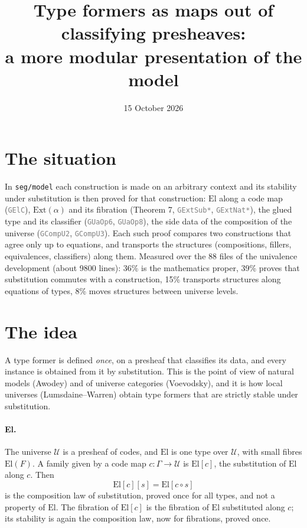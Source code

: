 \documentclass[11pt]{article}
\title{Type formers as maps out of classifying presheaves:\\
a more modular presentation of the model}
\date{15 October 2026}
\author{}
\newcommand{\seg}[1]{\textcolor{gray}{\texttt{\small #1}}}
\newcommand{\El}{\mathrm{El}}
\newcommand{\Ext}{\mathrm{Ext}}
\newcommand{\U}{\mathcal{U}}
\theoremstyle{remark}
\begin{document}
\maketitle

\section{The situation}

In \texttt{seg/model} each construction is made on an arbitrary context and
its stability under substitution is then proved for that construction: $\El$
along a code map (\seg{GElC}), $\Ext(\alpha)$ and its fibration (Theorem 7,
\seg{GExtSub*}, \seg{GExtNat*}), the glued type and its classifier
(\seg{GUaOp6}, \seg{GUaOp8}), the side data of the composition of the
universe (\seg{GCompU2}, \seg{GCompU3}).  Each such proof compares two
constructions that agree only up to equations, and transports the
structures (compositions, fillers, equivalences, classifiers) along them.
Measured over the 88 files of the univalence development (about 9800
lines): 36\% is the mathematics proper, 39\% proves that substitution
commutes with a construction, 15\% transports structures along equations
of types, 8\% moves structures between universe levels.

\section{The idea}

A type former is defined \emph{once}, on a presheaf that classifies its
data, and every instance is obtained from it by substitution.  This is the
point of view of natural models (Awodey) and of universe categories
(Voevodsky), and it is how local universes (Lumsdaine--Warren) obtain
type formers that are strictly stable under substitution.

\paragraph{El.}  The universe $\U$ is a presheaf of codes, and $\El$ is one
type over $\U$, with small fibres $\El(F)$.  A family given by a code map
$c : \Gamma \to \U$ is $\El[c]$, the substitution of $\El$ along $c$.  Then
\[ \El[c][s] = \El[c \circ s] \]
is the composition law of substitution, proved once for all types, and not
a property of $\El$.  The fibration of $\El[c]$ is the fibration of $\El$
substituted along $c$; its stability is again the composition law, now for
fibrations, proved once.
\end{document}
